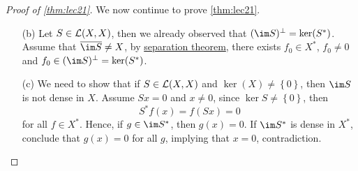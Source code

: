 \begin{proof}[Proof of \autoref{thm:lec21}]
	We now continue to prove \autoref{thm:lec21}.
	\begin{enumerate}
		\item[(b)] Let \(S\in \mathcal{\MakeUppercase{l}} (X, X)\), then we already observed that \((\im S)^{\perp} = \ker(S^{\ast} )\). Assume that \(\overline{\im S} \neq X\), by \hyperref[thm:separation-of-convex-sets]{separation theorem}, there exists \(f_0\in X^{\ast} \), \(f_0 \neq 0\) and \(f_0 \in (\im S)^{\perp} = \ker(S^{\ast} )\).
		\item[(c)] We need to show that if \(S\in \mathcal{\MakeUppercase{l}} (X, X)\) and \(\ker(X) \neq \left\{ 0 \right\} \), then \(\im S\) is not dense in \(X\). Assume \(Sx = 0\) and \(x \neq 0\), since \(\ker S \neq \left\{ 0 \right\} \), then
			\[
				S^{\ast} f(x) = f(Sx) = 0
			\]
			for all \(f\in X^{\ast} \). Hence, if \(g\in \im S^{\ast} \), then \(g(x) = 0\). If \(\im S^{\ast} \) is dense in \(X^{\ast} \), conclude that \(g(x) = 0\) for all \(g\), implying that \(x = 0\), contradiction.
	\end{enumerate}
\end{proof}

